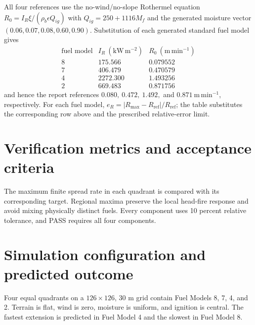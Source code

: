All four references use the no-wind/no-slope Rothermel equation
\(R_0=I_R\xi/(\rho_b\epsilon Q_{ig})\) with
\(Q_{ig}=250+1116M_f\) and the generated moisture vector
\((0.06,0.07,0.08,0.60,0.90)\).  Substitution of each generated standard
fuel model gives
\[
\begin{array}{c|cc}
\text{fuel model}&I_R~(\mathrm{kW\,m^{-2}})&R_0~(\mathrm{m\,min^{-1}})\\
\hline
8&175.566&0.079552\\
7&406.479&0.470579\\
4&2272.300&1.493256\\
2&669.483&0.871756
\end{array}
\]
and hence the report references \(0.080,\ 0.472,\ 1.492,\) and
\(0.871~\mathrm{m\,min^{-1}}\), respectively.  For each fuel model,
\(e_R=|R_{\max}-R_{\mathrm{ref}}|/R_{\mathrm{ref}}\); the table substitutes
the corresponding row above and the prescribed relative-error limit.

\section{Verification metrics and acceptance criteria}

The maximum finite spread rate in each quadrant is compared with its corresponding target.  Regional maxima preserve the local head-fire response and avoid mixing physically distinct fuels.  Every component uses 10 percent relative tolerance, and PASS requires all four components.

\section{Simulation configuration and predicted outcome}

Four equal quadrants on a \(126\times126\), 30 m grid contain Fuel Models 8, 7, 4, and 2. Terrain is flat, wind is zero, moisture is uniform, and ignition is central. The fastest extension is predicted in Fuel Model 4 and the slowest in Fuel Model 8.

